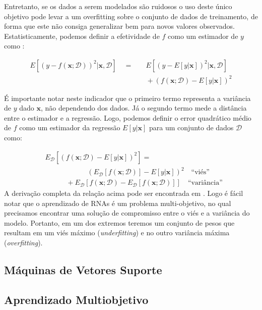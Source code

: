 \documentclass[conference]{IEEEtran}
\begin{document}
	 Entretanto, se os dados a serem modelados são ruidosos o uso deste único objetivo pode levar a um overfitting sobre o conjunto de dados de treinamento, de forma que este não consiga generalizar bem para novos valores observados. Estatisticamente, podemos definir a efetividade de $f$ como um estimador de $y$ como \cite{geman1992neural}:
	 
	 \begin{equation}
	 	\begin{aligned}
	 		E[(y - f(\mathbf{x}; \mathcal{D}))^2 | \mathbf{x}, \mathcal{D}] \quad = & \quad E\left[ (y - E \left[ y | \mathbf{x}\right] )^2 | \mathbf{x}, \mathcal{D}\right]   \\
	 		& \quad + (f(\mathbf{x};\mathcal{D}) - E[y|\mathbf{x}])^2
	 	\end{aligned}
	 \end{equation}
	 
	 É importante notar neste indicador que o primeiro termo representa a variância de $y$ dado $\mathbf{x}$, não dependendo dos dados. Já o segundo termo mede a distância entre o estimador e a regressão. Logo, podemos definir o error quadrático médio de $f$ como um estimador da regressão $E[y|\mathbf{x}]$ para um conjunto de dados $\mathcal{D}$ como:
	 
	 \begin{equation}
	 	\begin{aligned}
	 		& E_{\mathcal{D}}[(f(\mathbf{x};\mathcal{D}) - E[y|\mathbf{x}])^2] = \\ 
	 		& \qquad \qquad \qquad (E_{\mathcal{D}}[f(\mathbf{x}; \mathcal{D})] - E[y|\mathbf{x}])^2 \quad \text{``viés''} \\
	 		& \qquad \quad  + E_{\mathcal{D}}\left[ f(\mathbf{x};\mathcal{D}) - E_{\mathcal{D}}[f(\mathbf{x};\mathcal{D})]\right]   \quad \text{``variância''}
	 	\end{aligned}
	 \end{equation}
	 A derivação completa da relação acima pode ser encontrada em \cite{geman1992neural}. Logo é fácil notar que o aprendizado de RNAs é um problema multi-objetivo, no qual precisamos encontrar uma solução de compromisso entre o viés e a variância do modelo. Portanto, em um dos extremos teremos um conjunto de pesos que resultam em um viés máximo (\textit{underfitting}) e no outro variância máxima (\textit{overfitting}).
	 
	\subsection{Máquinas de Vetores Suporte}
	\subsection{Aprendizado Multiobjetivo}


	
    
	
	
\end{document}
